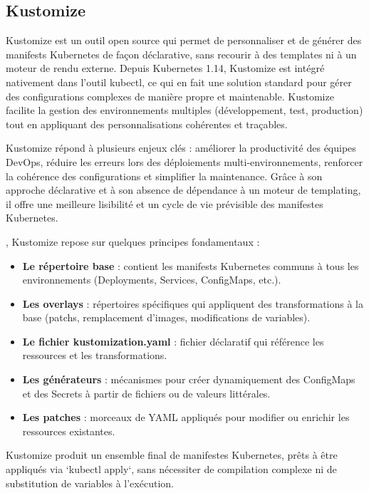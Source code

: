 \subsection{Kustomize}

Kustomize est un outil open source qui permet de personnaliser et de générer des manifests Kubernetes de façon déclarative, sans recourir à des templates ni à un moteur de rendu externe. Depuis Kubernetes 1.14, Kustomize est intégré nativement dans l’outil kubectl, ce qui en fait une solution standard pour gérer des configurations complexes de manière propre et maintenable. Kustomize facilite la gestion des environnements multiples (développement, test, production) tout en appliquant des personnalisations cohérentes et traçables.

 Kustomize répond à plusieurs enjeux clés  : améliorer la productivité des équipes DevOps, réduire les erreurs lors des déploiements multi-environnements, renforcer la cohérence des configurations et simplifier la maintenance. Grâce à son approche déclarative et à son absence de dépendance à un moteur de templating, il offre une meilleure lisibilité et un cycle de vie prévisible des manifestes Kubernetes.

, Kustomize repose sur quelques principes fondamentaux  :
\begin{itemize}
	\item \textbf{Le répertoire base}  : contient les manifests Kubernetes communs à tous les environnements (Deployments, Services, ConfigMaps, etc.).
	\item \textbf{Les overlays}  : répertoires spécifiques qui appliquent des transformations à la base (patchs, remplacement d’images, modifications de variables).
	\item \textbf{Le fichier kustomization.yaml}  : fichier déclaratif qui référence les ressources et les transformations.
	\item \textbf{Les générateurs}  : mécanismes pour créer dynamiquement des ConfigMaps et des Secrets à partir de fichiers ou de valeurs littérales.
	\item \textbf{Les patches}  : morceaux de YAML appliqués pour modifier ou enrichir les ressources existantes.
\end{itemize}

Kustomize produit un ensemble final de manifestes Kubernetes, prêts à être appliqués via `kubectl apply`, sans nécessiter de compilation complexe ni de substitution de variables à l’exécution.

